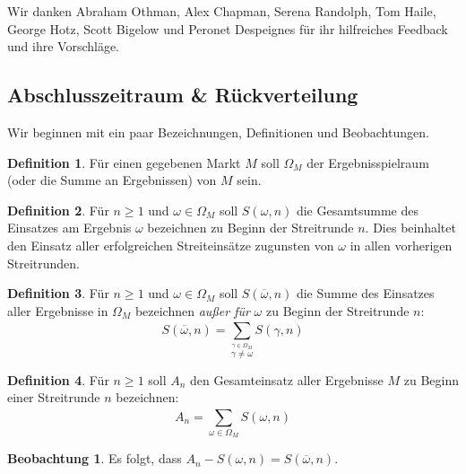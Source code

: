 \documentclass[floatfix,reprint,nofootinbib,amsmath,amssymb,epsfig,pre,floats,letterpaper,groupedaffiliation]{revtex4-1}
\theoremstyle{definition}
\newtheorem{observation}{Beobachtung}
\theoremstyle{definition}
\newtheorem{definition}{Definition}
\theoremstyle{definition}
\begin{document}
\begin{acknowledgments}\label{section:acknowledgements}
Wir danken Abraham Othman, Alex Chapman, Serena Randolph, Tom Haile, George Hotz, Scott Bigelow und Peronet Despeignes für ihr hilfreiches Feedback und ihre Vorschläge.
\end{acknowledgments}




\begin{appendix}

\cleardoublepage

\section{Abschlusszeitraum \& Rückverteilung}\label{section:finalization_time}

Wir beginnen mit ein paar Bezeichnungen, Definitionen und Beobachtungen.

\begin{definition}
Für einen gegebenen Markt $M$ soll ${\Omega}_M$ der Ergebnisspielraum (oder die Summe an Ergebnissen) von $M$ sein.
\end{definition}

\begin{definition}
Für $n \geq 1$ und $\omega \in {\Omega}_M$ soll $S(\omega,n)$ die Gesamtsumme des Einsatzes am Ergebnis $\omega$ bezeichnen zu Beginn der Streitrunde $n$. Dies beinhaltet den Einsatz aller erfolgreichen Streiteinsätze zugunsten von $\omega$ in allen vorherigen Streitrunden.
\end{definition}

\begin{definition}
Für $n \geq 1$ und $\omega \in {\Omega}_M$ soll $S(\overline{\omega},n)$ die Summe des Einsatzes aller Ergebnisse in ${\Omega}_M$ bezeichnen \emph{außer für} $\omega$ zu Beginn der Streitrunde $n$:
\[ S(\overline{\omega},n)= \sum_{\overset{\gamma \in {\Omega}_M}{\gamma \neq \omega}}^{} S(\gamma,n) \]
\end{definition}

\begin{definition}
Für $n \ge 1$ soll $A_n$ den Gesamteinsatz aller Ergebnisse $M$ zu Beginn einer Streitrunde $n$ bezeichnen: \[ A_n = \sum_{\omega \in {\Omega}_M}^{} S(\omega,n) \]
\end{definition}

\begin{observation}\label{ob:stake_partition}
Es folgt, dass $A_n - S(\omega,n) = S(\overline{\omega},n)$.
\end{observation}


\end{appendix}
\end{document}

